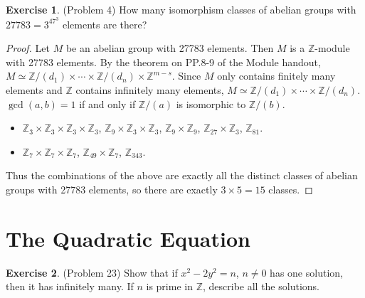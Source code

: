 \documentclass[12pt, psamsfonts]{amsart}
\theoremstyle{definition}
\newtheorem*{exer}{Exercise}
\theoremstyle{remark}
\numberwithin{equation}{section}
\begin{document}
\begin{exer}{(Problem 4)}
  How many isomorphism classes of abelian groups with $27783 = 3^47^3$ elements are there?
\end{exer}

\begin{proof}
  Let $M$ be an abelian group with 27783 elements.
  Then $M$ is a $\mathbb{Z}$-module with 27783 elements.
  By the theorem on PP.8-9 of the Module handout, $M \simeq \mathbb{Z}/(d_1) \times \cdots \times \mathbb{Z}/(d_n) \times \mathbb{Z}^{m - s}$.
  Since $M$ only contains finitely many elements and $\mathbb{Z}$ contains infinitely many elements, $M \simeq \mathbb{Z}/(d_1) \times \cdots \times \mathbb{Z}/(d_n)$.
  $\gcd(a, b) = 1$ if and only if $\mathbb{Z}/(a)$ is isomorphic to $\mathbb{Z}/(b)$.
  \begin{itemize}
    \item
      $\mathbb{Z}_3 \times \mathbb{Z}_3 \times \mathbb{Z}_3 \times \mathbb{Z}_3$, $\mathbb{Z}_9 \times \mathbb{Z}_3 \times \mathbb{Z}_3$,
      $\mathbb{Z}_9 \times \mathbb{Z}_9$, $\mathbb{Z}_{27} \times \mathbb{Z}_3$, $\mathbb{Z}_{81}$.
    \item
      $\mathbb{Z}_7 \times \mathbb{Z}_7 \times \mathbb{Z}_7$, $\mathbb{Z}_{49} \times \mathbb{Z}_7$, $\mathbb{Z}_{343}$.
  \end{itemize}
  Thus the combinations of the above are exactly all the distinct classes of abelian groups with 27783 elements, so there are exactly $3 \times 5 = 15$ classes.
\end{proof}

\section{The Quadratic Equation}

\begin{exer}{(Problem 23)}
  Show that if $x^2 - 2y^2 = n$, $n \ne 0$ has one solution, then it has infinitely many.
  If $n$ is prime in $\mathbb{Z}$, describe all the solutions.
\end{exer}
\end{document}
